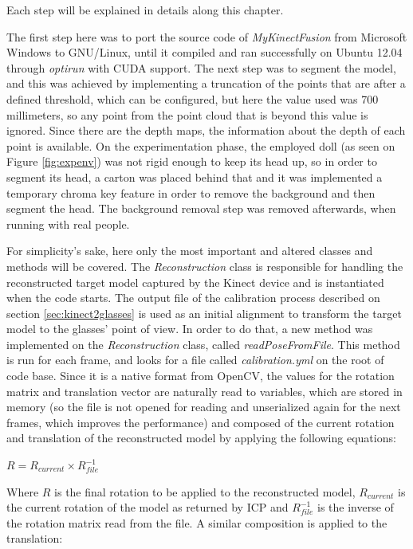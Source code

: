 \documentclass[msc, a4paper, classic, en]{ufbathesis}
\begin{document}
Each step will be explained in details along this chapter.

The first step here was to port the source code of \textit{MyKinectFusion} from Microsoft Windows to GNU/Linux, until it compiled and ran successfully on Ubuntu 12.04 through \textit{optirun} with CUDA support. The next step was to segment the model, and this was achieved by implementing a truncation of the points that are after a defined threshold, which can be configured, but here the value used was 700 millimeters, so any point from the point cloud that is beyond this value is ignored. Since there are the depth maps, the information about the depth of each point is available. On the experimentation phase, the employed doll (as seen on Figure \ref{fig:expenv}) was not rigid enough to keep its head up, so in order to segment its head, a carton was placed behind that and it was implemented a temporary chroma key feature in order to remove the background and then segment the head. The background removal step was removed afterwards, when running with real people.

For simplicity's sake, here only the most important and altered classes and methods will be covered. The \textit{Reconstruction} class is responsible for handling the reconstructed target model captured by the Kinect device and is instantiated when the code starts. The output file of the calibration process described on section \ref{sec:kinect2glasses} is used as an initial alignment to transform the target model to the glasses' point of view. In order to do that, a new method was implemented on the \textit{Reconstruction} class, called \textit{readPoseFromFile}. This method is run for each frame, and looks for a file called \textit{calibration.yml} on the root of code base. Since it is a native format from OpenCV, the values for the rotation matrix and translation vector are naturally read to variables, which are stored in memory (so the file is not opened for reading and unserialized again for the next frames, which improves the performance) and composed of the current rotation and translation of the reconstructed model by applying the following equations:

\begin{center}
$R = R_{current} \times R_{file}^{-1}$
\end{center}

Where $R$ is the final rotation to be applied to the reconstructed model, $R_{current}$ is the current rotation of the model as returned by ICP and $R_{file}^{-1}$ is the inverse of the rotation matrix read from the file. A similar composition is applied to the translation:
\end{document}
